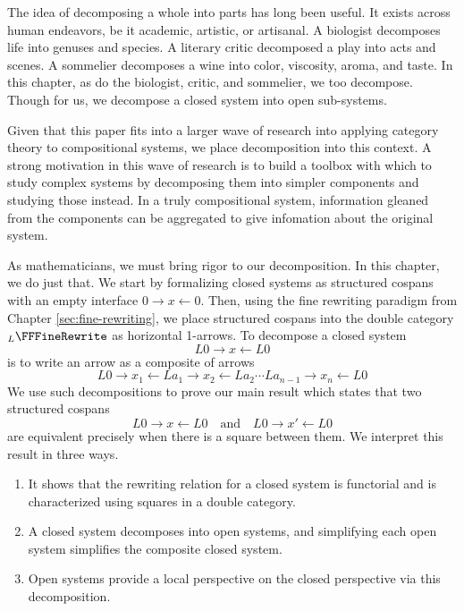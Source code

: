 \documentclass{amsart}
\begin{document}

The idea of decomposing a whole into parts has long been
useful. It exists across human endeavors, be it
academic, artistic, or artisanal. A biologist decomposes
life into genuses and species. A literary critic
decomposed a play into acts and scenes. A sommelier
decomposes a wine into color, viscosity, aroma, and
taste. In this chapter, as do the biologist, critic, and
sommelier, we too decompose. Though for us, we decompose a
closed system into open sub-systems.

Given that this paper fits into a larger wave of research
into applying category theory to compositional systems, we
place decomposition into this context.  A strong
motivation in this wave of research is to build a toolbox
with which to study complex systems by decomposing them into
simpler components and studying those instead. In a truly
compositional system, information gleaned from the
components can be aggregated to give infomation about the
original system.

As mathematicians, we must bring rigor to our
decomposition. In this chapter, we do just that. We start
by formalizing closed systems as structured cospans with an
empty interface $ 0 \to x \gets 0 $. Then,
using the fine rewriting paradigm from Chapter
\ref{sec:fine-rewriting}, we place structured cospans into
the double category $ _L \FFFineRewrite $ as horizontal
1-arrows.  To decompose a closed system $$L0 \to x \gets
L0$$ is to write an arrow as a composite of arrows
\[
  L0 \to x_1 \gets La_1 \to x_2 \gets La_2
  \dotsm La_{n-1} \to x_n \gets L0
\]
We use such decompositions to prove our main result which states that two structured cospans
\[
  L0 \to x \gets L0
  \quad \text{and} \quad
  L0 \to x' \gets L0
\]
are equivalent precisely when there is a square between
them.  We interpret this result in three ways.

\begin{enumerate}
\item It shows that the rewriting relation for a closed system
  is functorial and is characterized using squares in a double
  category.
\item A closed system decomposes into open systems, and
  simplifying each open system simplifies the composite
  closed system.  
\item Open systems provide a local perspective on the closed
  perspective via this decomposition.
\end{enumerate}
\end{document}

